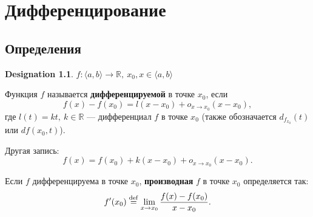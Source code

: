 \documentclass[11pt]{book}
\newcommand{\R}{\mathbb{R}}
\def\mydef{\mathrel{\stackrel{\rm def}=}}
\theoremstyle{definition}
\theoremstyle{plain}
\theoremstyle{plain}
\theoremstyle{definition}
\newtheorem*{name}{Designation}
\theoremstyle{remark}
\begin{document}
\chapter{Дифференцирование}
\section{Определения}
\begin{name}
    $ f: \langle a, b \rangle \to \R, ~ x_0, x \in \langle a,b \rangle$
\end{name}
\begin{defn}
    Функция $ f$ называется {\bf  дифференцируемой} в точке $ x_0$, если
    \[
	f(x) -f(x_0) = l(x-x_0) + o_{x \to  x_0}(x -x_0)
    ,\]
    где $ l(t) = kt, ~ k \in \R$ --- дифференциал $ f$ в точке  $ x_0$ (также обозначается $ d_{f_{x_0}}(t)$ или $ df(x_0, t)$).

    Другая запись:
    \[
	f(x) = f(x_0) + k(x-x_0) + o_{x \to  x_0}(x-x_0)
    .\]
\end{defn}
\begin{defn}
    Если $ f$ дифференцируема в точке $ x_0$, {\bf производная} $ f$ в  точке $ x_0$ определяется так:
    \[
	f'(x_0) \mydef \lim_{x \to  x_0} \frac{f(x)-f(x_0)}{x-x_0}
    .\]
\end{defn}
\end{document}
